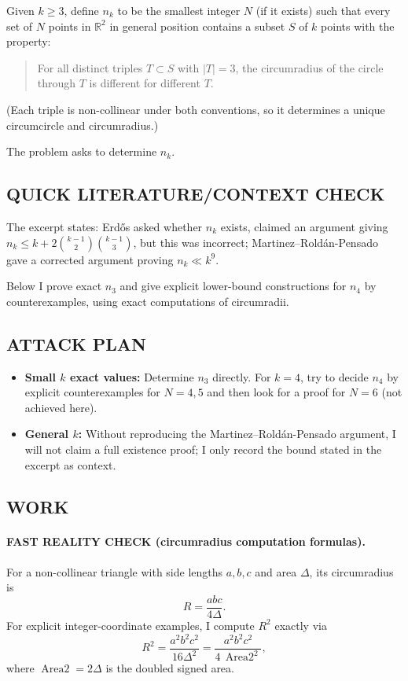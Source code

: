 Given $k\ge 3$, define $n_k$ to be the smallest integer $N$ (if it exists) such that every set of $N$ points in $\mathbb{R}^2$ in general position contains a subset $S$ of $k$ points with the property:
\begin{quote}
For all distinct triples $T\subset S$ with $|T|=3$, the circumradius of the circle through $T$ is different for different $T$.
\end{quote}
(Each triple is non-collinear under both conventions, so it determines a unique circumcircle and circumradius.)

The problem asks to determine $n_k$.

\subsection*{QUICK LITERATURE/CONTEXT CHECK}
The excerpt states: Erd\H{o}s asked whether $n_k$ exists, claimed an argument giving $n_k\le k+2\binom{k-1}{2}\binom{k-1}{3}$, but this was incorrect; Martinez--Rold\'an-Pensado gave a corrected argument proving $n_k\ll k^9$.

Below I prove exact $n_3$ and give explicit lower-bound constructions for $n_4$ by counterexamples, using exact computations of circumradii.

\subsection*{ATTACK PLAN}
\begin{itemize}
\item \textbf{Small $k$ exact values:} Determine $n_3$ directly. For $k=4$, try to decide $n_4$ by explicit counterexamples for $N=4,5$ and then look for a proof for $N=6$ (not achieved here).
\item \textbf{General $k$:} Without reproducing the Martinez--Rold\'an-Pensado argument, I will not claim a full existence proof; I only record the bound stated in the excerpt as context.
\end{itemize}

\subsection*{WORK}
\paragraph{FAST REALITY CHECK (circumradius computation formulas).}
For a non-collinear triangle with side lengths $a,b,c$ and area $\Delta$, its circumradius is
\[
R = \frac{abc}{4\Delta}.
\]
For explicit integer-coordinate examples, I compute $R^2$ exactly via
\[
R^2 = \frac{a^2 b^2 c^2}{16\Delta^2} = \frac{a^2 b^2 c^2}{4\,\operatorname{Area2}^2},
\]
where $\operatorname{Area2}=2\Delta$ is the doubled signed area.

